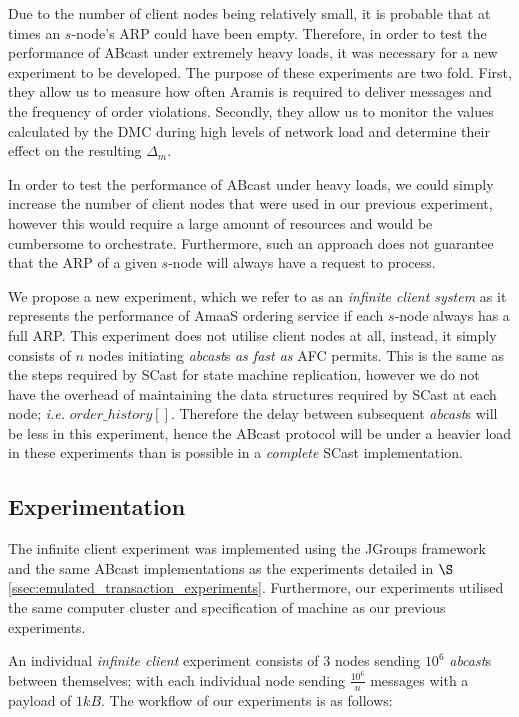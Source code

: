     Due to the number of client nodes being relatively small, it is probable that at times an $s$-node's ARP could have been empty.  Therefore, in order to test the performance of \textsf{ABcast} under extremely heavy loads, it was necessary for a new experiment to be developed.  The purpose of these experiments are two fold.  First, they allow us to measure how often \textsf{Aramis} is required to deliver messages and the frequency of order violations.  Secondly, they allow us to monitor the values calculated by the DMC during high levels of network load and determine their effect on the resulting $\Delta_m$.  
    
    In order to test the performance of \textsf{ABcast} under heavy loads, we could simply increase the number of client nodes that were used in our previous experiment, however this would require a large amount of resources and would be cumbersome to orchestrate.  Furthermore, such an approach does not guarantee that the ARP of a given $s$-node will always have a request to process.  
    
    We propose a new experiment, which we refer to  as an \emph{infinite client system} as it represents the performance of \textsf{AmaaS} ordering service if each $s$-node always has a full ARP.  This experiment does not utilise client nodes at all, instead, it simply consists of $n$ nodes initiating \emph{abcast}s \emph{as fast as} \textsf{AFC} permits.  This is the same as the steps required by \textsf{SCast} for state machine replication, however we do not have the overhead of maintaining the data structures required by \textsf{SCast} at each node; \emph{i.e.} $order\_history[]$.  Therefore the delay between subsequent \emph{abcast}s will be less in this experiment, hence the \textsf{ABcast} protocol will be under a heavier load in these experiments than is possible in a \emph{complete} \textsf{SCast} implementation. 
    
    \subsection{Experimentation}\label{ssec: infinite_experimentation}
    The infinite client experiment was implemented using the JGroups framework and the same \textsf{ABcast} implementations as the experiments detailed in $\S$ \ref{ssec:emulated_transaction_experiments}.  Furthermore, our experiments utilised the same computer cluster and specification of machine as our previous experiments.  
    
    An individual \emph{infinite client} experiment consists of $3$ nodes sending $10^6$ \emph{abcast}s between themselves; with each individual node sending $\frac{10^6}{n}$ messages with a payload of $1kB$.  The workflow of our experiments is as follows:
    

